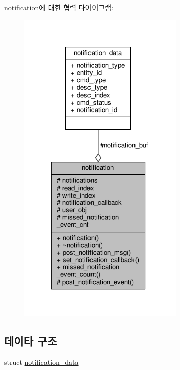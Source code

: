 notification에 대한 협력 다이어그램\+:
\nopagebreak
\begin{figure}[H]
\begin{center}
\leavevmode
\includegraphics[width=225pt]{classavdecc__lib_1_1notification__coll__graph}
\end{center}
\end{figure}
\subsection*{데이타 구조}
\begin{DoxyCompactItemize}
\item 
struct \hyperlink{structavdecc__lib_1_1notification_1_1notification__data}{notification\+\_\+data}
\end{DoxyCompactItemize}
